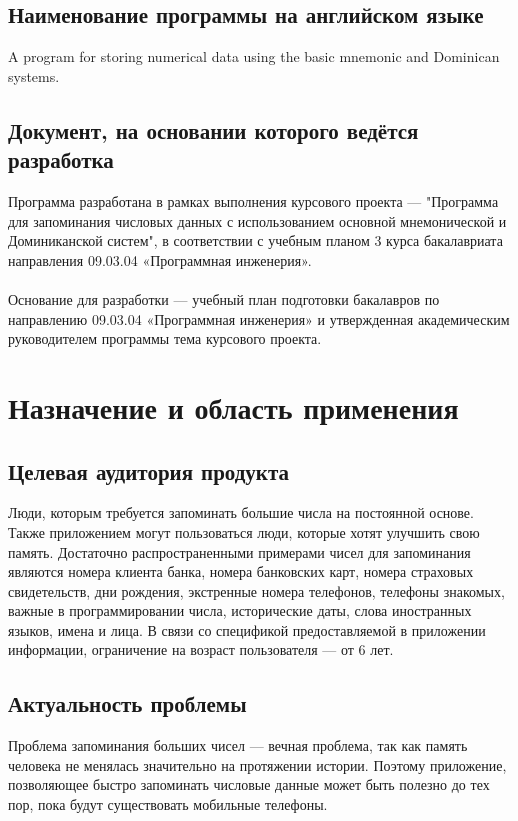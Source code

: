 \documentclass[draft]{article}
\begin{document}
\subsection{Наименование программы на английском языке}
A program for storing numerical data using the basic mnemonic and Dominican systems.
\subsection{Документ, на основании которого ведётся разработка}
Программа разработана в рамках выполнения курсового проекта — "{}Программа для запоминания числовых данных с использованием основной мнемонической и Доминиканской систем"{}, в соответствии с учебным планом 3 курса бакалавриата направления 09.03.04
«Программная инженерия»\cite{litlink2}.\\
~\\
Основание для разработки — учебный план подготовки бакалавров по направлению
09.03.04 «Программная инженерия»\cite{litlink3} и утвержденная академическим руководителем
программы тема курсового проекта.
\newpage
\section{Назначение и область применения}
\subsection{Целевая аудитория продукта}
Люди, которым требуется запоминать большие числа на постоянной основе. Также приложением могут пользоваться люди, которые хотят улучшить свою память. Достаточно распространенными примерами чисел для запоминания являются номера клиента банка, номера банковских карт, номера страховых свидетельств, дни рождения, экстренные номера телефонов, телефоны знакомых, важные в программировании числа, исторические даты, слова иностранных языков, имена и лица. В связи со спецификой предоставляемой в приложении информации, ограничение на возраст пользователя — от 6 лет.
\subsection{Актуальность проблемы}
Проблема запоминания больших чисел — вечная проблема, так как память человека не менялась значительно на протяжении истории. Поэтому приложение, позволяющее быстро запоминать числовые данные может быть полезно до тех пор, пока будут существовать мобильные телефоны.
\end{document}
